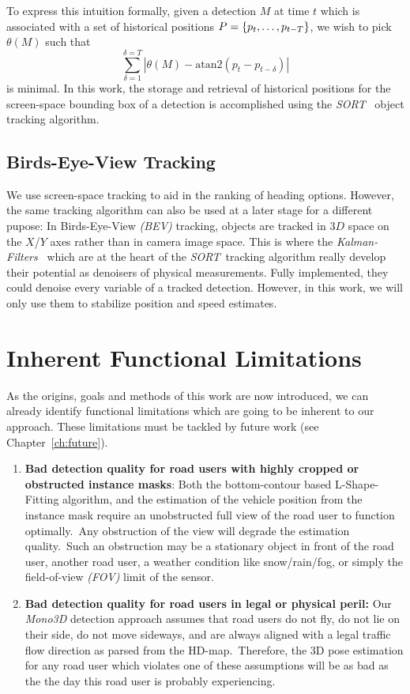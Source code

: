 To express this intuition formally, given a detection $M$ at time $t$ which is associated with a set of historical positions $P=\{p_{t},\mathellipsis,p_{t-T}\}$, we wish to pick $\theta(M)$ such that \[\sum_{\delta=1}^{\delta=T} |\theta(M) - \text{atan2}(p_t - p_{t-\delta})|\] is minimal.
In this work, the storage and retrieval of historical positions for the screen-space bounding box of a detection is accomplished using the \textit{SORT}~\cite{bewley2016simple} object tracking algorithm.

\subsection{Birds-Eye-View Tracking}
\label{subsec:bevtracking}

We use screen-space tracking to aid in the ranking of heading options.
However, the same tracking algorithm can also be used at a later stage for a different pupose:
In Birds-Eye-View \textit{(BEV)} tracking, objects are tracked in $3D$ space on the $X$/$Y$ axes rather than in camera image space.
This is where the \textit{Kalman-Filters}~\cite{welch1995kalman} which are at the heart of the \textit{SORT}~tracking algorithm really develop their potential as denoisers of physical measurements.
Fully implemented, they could denoise every variable of a tracked detection.
However, in this work, we will only use them to stabilize position and speed estimates.

\section{Inherent Functional Limitations}
\label{sec:limits}

As the origins, goals and methods of this work are now introduced, we can already identify functional limitations which are going to be inherent to our approach.
These limitations must be tackled by future work (see Chapter~\ref{ch:future}).

\begin{enumerate}
    \item \textbf{Bad detection quality for road users with highly cropped or obstructed instance masks}: Both the bottom-contour based L-Shape-Fitting algorithm, and the estimation of the vehicle position from the instance mask require an unobstructed full view of the road user to function optimally.\ Any obstruction of the view will degrade the estimation quality.\ Such an obstruction may be a stationary object in front of the road user, another road user, a weather condition like snow/rain/fog, or simply the field-of-view \textit{(FOV)} limit of the sensor.
    \item \textbf{Bad detection quality for road users in legal or physical peril:} Our \textit{Mono3D} detection approach assumes that road users do not fly, do not lie on their side, do not move sideways, and are always aligned with a legal traffic flow direction as parsed from the HD-map.\ Therefore, the 3D pose estimation for any road user which violates one of these assumptions will be as bad as the the day this road user is probably experiencing.
\end{enumerate}

